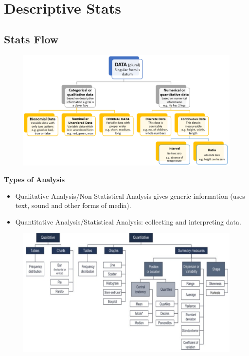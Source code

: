 \documentclass{beamer}
\begin{document}
\section{Descriptive Stats}

\subsection{Stats Flow} 
\begin{frame}
\begin{figure}
	\includegraphics[scale=0.4]{Data} 
\end{figure}
\end{frame}

\begin{frame}\textbf{Types of Analysis}
\begin{itemize}
\item Qualitative Analysis/Non-Statistical Analysis gives generic information (uses text, sound and other forms of media).
\item Quantitative Analysis/Statistical Analysis: collecting and interpreting data.

\end{itemize}
\begin{figure}
\includegraphics[scale=0.3]{QuantitativeQualitative} 
\end{figure}
\end{frame}
\end{document}
